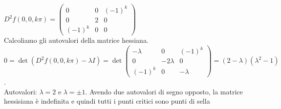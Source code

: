 \documentclass{article}
\begin{document}
$D^2f(0,0,k\pi)=\begin{pmatrix}
    0&0&(-1)^k\\
    0&2&0\\
    (-1)^k&0&0
\end{pmatrix}$\\
Calcoliamo gli autovalori della matrice hessiana.\\
$0=\det(D^2 f(0,0,k\pi)-\lambda I)= \det\begin{pmatrix}
    -\lambda&0&(-1)^k\\
    0&-2\lambda&0\\
    (-1)^k&0&-\lambda
\end{pmatrix}=(2-\lambda)(\lambda^2-1)$.\\
Autovalori: $\lambda=2$ e $\lambda= \pm 1$. Avendo due autovalori di segno opposto, la matrice hessisiana è indefinita e quindi tutti i punti critici sono punti di sella
\end{document}
